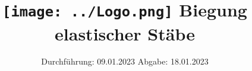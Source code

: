 

\subject{V103}
\title{\texttt{[image: ../Logo.png]}
Biegung elastischer Stäbe}
\date{%
  Durchführung: 09.01.2023
  \hspace{3em}
  Abgabe: 18.01.2023
}



\maketitle
\thispagestyle{empty}
\tableofcontents
\newpage






\printbibliography{}


